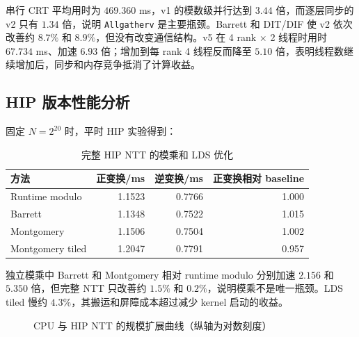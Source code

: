 串行 CRT 平均用时为 $469.360$ ms，v1 的模数级并行达到 $3.44$ 倍，而逐层同步的 v2 只有 $1.34$ 倍，说明 \texttt{Allgatherv} 是主要瓶颈。Barrett 和 DIT/DIF 使 v2 依次改善约 $8.7\%$ 和 $8.9\%$，但没有改变通信结构。v5 在 4 rank $\times$ 2 线程时用时 $67.734$ ms、加速 $6.93$ 倍；增加到每 rank 4 线程反而降至 $5.10$ 倍，表明线程数继续增加后，同步和内存竞争抵消了计算收益。

\subsection{HIP 版本性能分析}

固定 $N=2^{20}$ 时，平时 HIP 实验得到：

\begin{table}[H]
  \centering
  \caption{完整 HIP NTT 的模乘和 LDS 优化}
  \label{tab:gpu-full}
  \begin{tabular}{l r r r}
    \toprule
    方法 & 正变换/ms & 逆变换/ms & 正变换相对 baseline \\
    \midrule
    Runtime modulo & 1.1523 & 0.7766 & 1.000 \\
    Barrett & 1.1348 & 0.7522 & 1.015 \\
    Montgomery & 1.1506 & 0.7504 & 1.002 \\
    Montgomery tiled & 1.2047 & 0.7791 & 0.957 \\
    \bottomrule
  \end{tabular}
\end{table}

独立模乘中 Barrett 和 Montgomery 相对 runtime modulo 分别加速 $2.156$ 和 $5.350$ 倍，但完整 NTT 只改善约 $1.5\%$ 和 $0.2\%$，说明模乘不是唯一瓶颈。LDS tiled 慢约 $4.3\%$，其搬运和屏障成本超过减少 kernel 启动的收益。

\begin{figure}[H]
  \centering
  \caption{CPU 与 HIP NTT 的规模扩展曲线（纵轴为对数刻度）}
  \label{fig:gpu-scale}
\end{figure}


